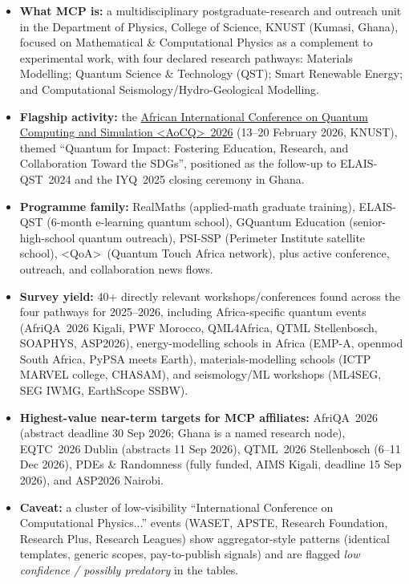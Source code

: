 \documentclass[11pt,a4paper]{article}
\begin{document}
\begin{itemize}[leftmargin=1.4em]
  \item \textbf{What MCP is:} a multidisciplinary postgraduate-research and outreach unit in the Department of Physics, College of Science, KNUST (Kumasi, Ghana), focused on Mathematical \& Computational Physics as a complement to experimental work, with four declared research pathways: Materials Modelling; Quantum Science \& Technology (QST); Smart Renewable Energy; and Computational Seismology/Hydro-Geological Modelling.
  \item \textbf{Flagship activity:} the \href{https://physics.knust.edu.gh/mcp/2026}{African International Conference on Quantum Computing and Simulation \textless AoC\textbar Q\textgreater\ 2026} (13--20 February 2026, KNUST), themed ``Quantum for Impact: Fostering Education, Research, and Collaboration Toward the SDGs'', positioned as the follow-up to ELAIS-QST~2024 and the IYQ~2025 closing ceremony in Ghana.
  \item \textbf{Programme family:} RealMaths (applied-math graduate training), ELAIS-QST (6-month e-learning quantum school), GQuantum Education (senior-high-school quantum outreach), PSI-SSP (Perimeter Institute satellite school), \textless QoA\textgreater\ (Quantum Touch Africa network), plus active conference, outreach, and collaboration news flows.
  \item \textbf{Survey yield:} 40+ directly relevant workshops/conferences found across the four pathways for 2025--2026, including Africa-specific quantum events (AfriQA~2026 Kigali, PWF Morocco, QML4Africa, QTML Stellenbosch, SOAPHYS, ASP2026), energy-modelling schools in Africa (EMP-A, openmod South Africa, PyPSA meets Earth), materials-modelling schools (ICTP MARVEL college, CHASAM), and seismology/ML workshops (ML4SEG, SEG IWMG, EarthScope SSBW).
  \item \textbf{Highest-value near-term targets for MCP affiliates:} AfriQA~2026 (abstract deadline 30 Sep 2026; Ghana is a named research node), EQTC~2026 Dublin (abstracts 11 Sep 2026), QTML~2026 Stellenbosch (6--11 Dec 2026), PDEs \& Randomness (fully funded, AIMS Kigali, deadline 15 Sep 2026), and ASP2026 Nairobi.
  \item \textbf{Caveat:} a cluster of low-visibility ``International Conference on Computational Physics...'' events (WASET, APSTE, Research Foundation, Research Plus, Research Leagues) show aggregator-style patterns (identical templates, generic scopes, pay-to-publish signals) and are flagged \emph{low confidence / possibly predatory} in the tables.
\end{itemize}
\end{document}
